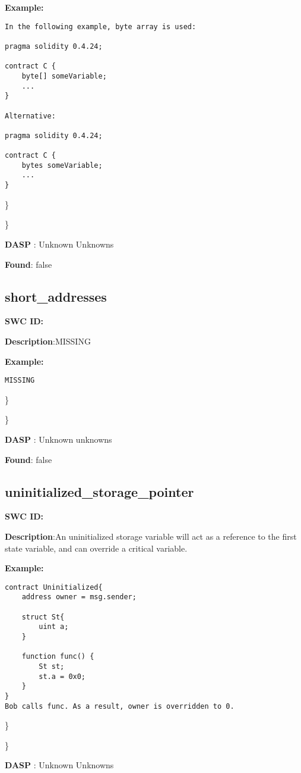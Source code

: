\documentclass{article}
\begin{document}
\textbf{Example:} 
\begin{verbatim}
In the following example, byte array is used:

pragma solidity 0.4.24;

contract C {
    byte[] someVariable;
    ...
}

Alternative:

pragma solidity 0.4.24;

contract C {
    bytes someVariable;
    ...
}

\end{verbatim}\} 

\} 

\textbf{DASP} : Unknown Unknowns

\textbf{Found}: false

\subsection{short\_addresses} 
\textbf{SWC \textunderscore ID:} 

\textbf{Description}:MISSING


\textbf{Example:} 
\begin{verbatim}
MISSING

\end{verbatim}\} 

\} 

\textbf{DASP} : Unknown unknowns

\textbf{Found}: false

\subsection{uninitialized\_storage\_pointer} 
\textbf{SWC \textunderscore ID:} 

\textbf{Description}:An uninitialized storage variable will act as a reference to the first state variable, and can override a critical variable.


\textbf{Example:} 
\begin{verbatim}
contract Uninitialized{
    address owner = msg.sender;

    struct St{
        uint a;
    }

    function func() {
        St st;
        st.a = 0x0;
    }
}
Bob calls func. As a result, owner is overridden to 0.

\end{verbatim}\} 

\} 

\textbf{DASP} : Unknown Unknowns
\end{document}
